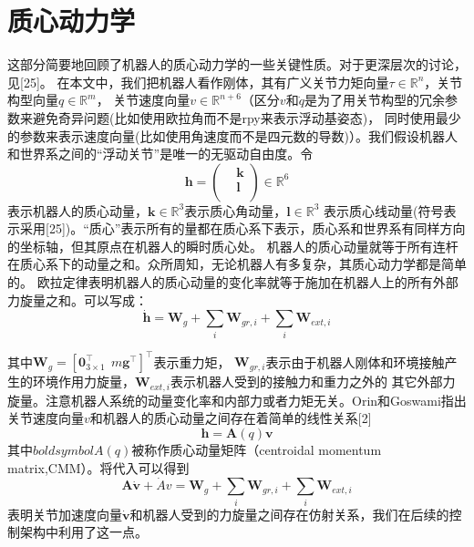 \section{质心动力学}
这部分简要地回顾了机器人的质心动力学的一些关键性质。对于更深层次的讨论，见[25]。
在本文中，我们把机器人看作刚体，其有广义关节力矩向量$\tau \in {{\mathbb{R}}^{n}}$，关节构型向量$q\in {{\mathbb{R}}^{m}}$，
关节速度向量$v\in {{\mathbb{R}}^{n+6}}$（区分$v$和$\dot q$是为了用关节构型的冗余参数来避免奇异问题(比如使用欧拉角而不是rpy来表示浮动基姿态)，
同时使用最少的参数来表示速度向量(比如使用角速度而不是四元数的导数)）。我们假设机器人和世界系之间的“浮动关节”是唯一的无驱动自由度。令
\begin{equation}
    \label{equ:momentum}
    \boldsymbol{h}=\left(\begin{aligned}
        & \boldsymbol{k} \\ 
       & \boldsymbol{l} \\ 
      \end{aligned} \right)\in \mathbb{R}^{6}
\end{equation}
表示机器人的质心动量，$\boldsymbol{k}\in {{\mathbb{R}}^{3}}$表示质心角动量，$\boldsymbol{l}\in {{\mathbb{R}}^{3}}$
表示质心线动量(符号表示采用[25])。“质心”表示所有的量都在质心系下表示，质心系和世界系有同样方向的坐标轴，但其原点在机器人的瞬时质心处。
机器人的质心动量就等于所有连杆在质心系下的动量之和。众所周知，无论机器人有多复杂，其质心动力学都是简单的。
欧拉定律表明机器人的质心动量的变化率就等于施加在机器人上的所有外部力旋量之和。可以写成：
\begin{equation}
    \label{equ:euler's_law}
    \dot{\boldsymbol{h}}={{\boldsymbol{W}}_{g}}+\sum\limits_{i}{{{\boldsymbol{W}}_{gr,i}}}+\sum\limits_{i}{{{\boldsymbol{W}}_{ext,i}}}
\end{equation}
	
其中${{\boldsymbol{W}}_{g}}={{[\mathbf{0}_{3\times 1}^{\top }\ \ m{{\mathbf{g}}^{\top }}]}^{\top }}$表示重力矩，
${\boldsymbol{W}}_{gr,i}$表示由于机器人刚体和环境接触产生的环境作用力旋量，${\boldsymbol{W}}_{ext,i}$表示机器人受到的接触力和重力之外的
其它外部力旋量。注意机器人系统的动量变化率和内部力或者力矩无关。Orin和Goswami指出关节速度向量$v$和机器人的质心动量之间存在着简单的线性关系[2]
\begin{equation}
    \label{equ:euler_linear_equ}
    \boldsymbol{h}=\boldsymbol{A}(q)\boldsymbol{v}
\end{equation}
其中$boldsymbol{A}(q)$被称作质心动量矩阵（centroidal momentum matrix,CMM）。将代入可以得到
\begin{equation}
    \label{equ:euler_wrench}
    \boldsymbol{A}\dot{\boldsymbol{v}}+\dot{A}v={{\boldsymbol{W}}_{g}}+\sum\limits_{i}{{{\boldsymbol{W}}_{gr,i}}}
    +\sum\limits_{i}{{{\boldsymbol{W}}_{ext,i}}}
\end{equation}
表明关节加速度向量$\dot{\boldsymbol{v}}$和机器人受到的力旋量之间存在仿射关系，我们在后续的控制架构中利用了这一点。

